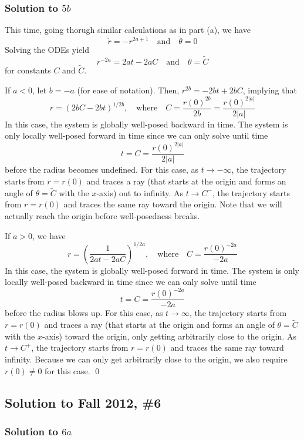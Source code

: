 \subsubsection*{Solution to $5b$}

This time, going thorugh similar calculations as in part (a), we have
$$\dot{r} = -r^{2a+1} \quad \text{and} \quad \dot{\theta} = 0 $$
Solving the ODEs yield
$$ r^{-2a} = 2at - 2aC \quad \text{and} \quad \theta = \tilde{C} $$
for constants $C$ and $\tilde{C}$.

If $a < 0$, let $b = -a$ (for ease of notation). Then, $r^{2b} = -2bt + 2bC$, implying that
$$ r = \left( 2bC - 2bt \right)^{1/2b}, \quad \text{where} \quad C = \frac{r(0)^{2b}}{2b} = \frac{r(0)^{2|a|}}{2|a|} $$
In this case, the system is globally well-posed backward in time. The system is only locally well-posed forward in time since we can only solve until time
$$ t = C = \frac{r(0)^{2|a|}}{2|a|} $$
before the radius becomes undefined. For this case, as $t \to -\infty$, the trajectory starts from $r=r(0)$ and traces a ray (that starts at the origin and forms an angle of $\theta = \tilde{C}$ with the $x$-axis) out to infinity. As $t \to C^-$, the trajectory starts from $r=r(0)$ and traces the same ray toward the origin. Note that we will actually reach the origin before well-posedness breaks.

If $a > 0$, we have
$$ r = \left( \frac{1}{2at - 2aC} \right)^{1/2a}, \quad \text{where} \quad C = \frac{r(0)^{-2a}}{-2a} $$
In this case, the system is globally well-posed forward in time. The system is only locally well-posed backward in time since we can only solve until time
$$ t = C = \frac{r(0)^{-2a}}{-2a} $$
before the radius blows up. For this case, as $t \to \infty$, the trajectory starts from $r=r(0)$ and traces a ray (that starts at the origin and forms an angle of $\theta = \tilde{C}$ with the $x$-axis) toward the origin, only getting arbitrarily close to the origin. As $t \to C^+$, the trajectory starts from $r=r(0)$ and traces the same ray toward infinity. Because we can only get arbitrarily close to the origin, we also require $r(0) \neq 0$ for this case. \hfill \qed

\subsection*{Solution to Fall 2012, \#6}
\label{F12Q6}

\subsubsection*{Solution to $6a$}

